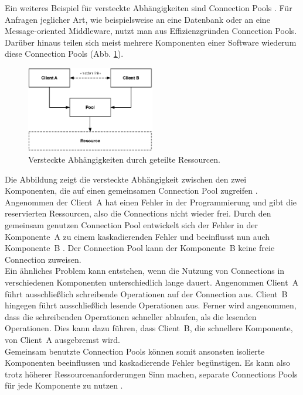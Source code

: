 Ein weiteres Beispiel für versteckte Abhängigkeiten sind Connection Pools \cite[S.~214]{newman_building_2015}. Für Anfragen jeglicher Art, wie beispielsweise an eine Datenbank oder an eine Message-oriented Middleware, nutzt man aus Effizienzgründen Connection Pools. Darüber hinaus teilen sich meist mehrere Komponenten einer Software wiederum diese Connection Pools (Abb. \ref{fig:no-bulkheads}).  

\begin{figure}[H]
 \centering
 \includegraphics[width=0.5\textwidth]{4-Hauptteil/bulkheads/no-bulkheads.eps}
 \caption{Versteckte Abhängigkeiten durch geteilte Ressourcen.}
 \label{fig:no-bulkheads}
\end{figure}

Die Abbildung zeigt die versteckte Abhängigkeit zwischen den zwei Komponenten, die auf einen gemeinsamen Connection Pool zugreifen \cite[S.~95]{nygard_release_2007}.\\
Angenommen der Client~A hat einen Fehler in der Programmierung und gibt die reservierten Ressourcen, also die Connections nicht wieder frei. Durch den gemeinsam genutzen Connection Pool entwickelt sich der Fehler in der Komponente~A zu einem kaskadierenden Fehler und beeinflusst nun auch Komponente~B \cite[S.~95]{nygard_release_2007} \cite[S.~214]{newman_building_2015}. Der Connection Pool kann der Komponente~B keine freie Connection zuweisen.\\
Ein ähnliches Problem kann entstehen, wenn die Nutzung von Connections in verschiedenen Komponenten unterschiedlich lange dauert. Angenommen Client~A führt ausschließlich schreibende Operationen auf der Connection aus. Client~B hingegen führt ausschließlich lesende Operationen aus. Ferner wird angenommen, dass die schreibenden Operationen schneller ablaufen, als die lesenden Operationen. Dies kann dazu führen, dass Client~B, die schnellere Komponente, von Client~A ausgebremst wird.\\
Gemeinsam benutzte Connection Pools können somit ansonsten isolierte Komponenten beeinflussen und kaskadierende Fehler begünstigen. Es kann also trotz höherer Ressourcenanforderungen Sinn machen, separate Connections Pools für jede Komponente zu nutzen \cite[S.~214]{newman_building_2015}.\\

